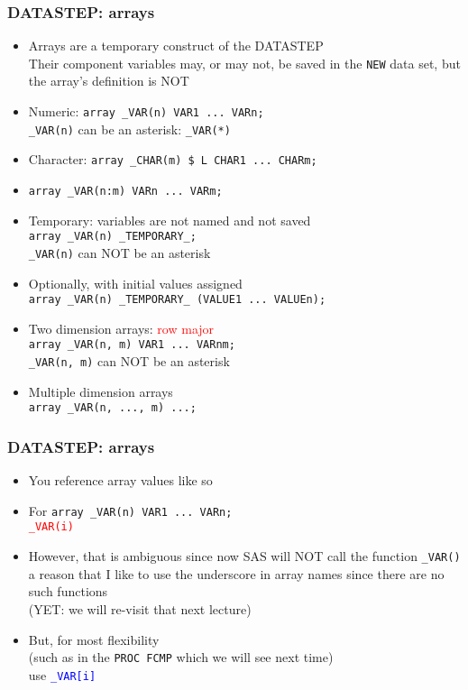 \documentclass[11pt,pdftex,dvipsnames,usenames,helvetica]{beamer}
\begin{document}
\begin{frame}[fragile]
\frametitle{DATASTEP: arrays}
\begin{itemize}
\item Arrays are a temporary construct of the DATASTEP\\
Their component variables may, or may not, be saved in the 
{\tt NEW} data set, but the array's definition is NOT
\item Numeric: {\tt array \_VAR(n) VAR1 ...\ VARn;}\\
{\tt \_VAR(n)} can be an asterisk: {\tt \_VAR(*)}
\item Character: {\tt array \_CHAR(m) \$ L CHAR1 ...\ CHARm;}
\item {\tt array \_VAR(n:m) VARn ...\ VARm;} 
\item Temporary: variables are not named and not saved\\
{\tt array \_VAR(n) \_TEMPORARY\_;}\\
{\tt \_VAR(n)} can NOT be an asterisk\
\item Optionally, with initial values assigned\\
 {\tt array \_VAR(n) \_TEMPORARY\_ 
(VALUE1 ...\ VALUEn);}
\item Two dimension arrays: \textcolor{red}{row major}\\
{\tt array \_VAR(n, m) VAR1 ...\ VARnm;} \\
{\tt \_VAR(n, m)} can NOT be an asterisk\\
\item Multiple dimension arrays\\
{\tt array \_VAR(n, ..., m) ...;} 
\end{itemize}
\end{frame}

\begin{frame}[fragile]
\frametitle{DATASTEP: arrays}
\begin{itemize}
\item You reference array values like so
\item For {\tt array \_VAR(n) VAR1 ...\ VARn;} \\
\textcolor{red}{\tt \_VAR(i)}
\item However, that is ambiguous since now SAS will NOT call
the function {\tt \_VAR()}\\
a reason that I like to use the underscore
in array names since there are no such functions \\
(YET: we will re-visit that next lecture)
\item But, for most flexibility\\
 (such as in the {\tt PROC FCMP}
which we will see next time)\\
use \textcolor{blue}{\tt \_VAR[i]}
\end{itemize}
\end{frame}
\end{document}
